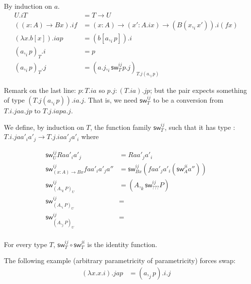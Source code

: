 \documentclass[10pt,a4paper]{article}
\begin{document}
\newcommand\iso[3]{\mathsf{iso}(#1,#2)_{#3}}
\newcommand\sw[3]{\mathsf{sw}^{#1#2}_{#3}}

\begin{definition}[$a.i$]
By induction on $a$.
\begin{align*}
  U.i T &= T → U \\
  ((x:A) → B x).i f &= (x:A) → (x' : A.i x) → (B (x,_i x')).i (f x) \\
  (λx. b[x]).i a p &= (b [a,_i p]).i \\
  (a,_i p)_T.i  &= p \\
  (a,_i p)_T.j  &= (a.j ,_i \sw i j T p.j)_{T.j (a ,_i p)}
\end{align*}
\end{definition}

Remark on the last line: $p : T.i a$ so $p.j : (T.i a).j p$;  but the pair expects something of type $(T.j (a ,_i p)).i a.j$.
That is, we need $\sw i j T$ to be a conversion from $T.i.j a a.j p$ to $T.j.i a p a.j$.

\begin{definition}[$\sw i j T$]
We define, by induction on $T$, the function family $\sw i j T$, such that
it has type : $T.i.j a a'_i a'_j → T.j.i a a'_j a'_i $ where
  
\begin{align*}
  \sw i j {U} R a a'_i a'_j & = R a a'_j a'_i  \\
  \sw i j {(x:A) → B x} f a a'_i a'_j a'' & = \sw i j {B x} (f a a'_j a'_i (\sw j i A a'')) \\
  \sw i j {(A ,_k P)_U} & = (A ,_k \sw i j {???} P) \\
  \sw i j {(A ,_i P)_U} & =  \\
  \sw i j {(A ,_j P)_U} & =  \\
\end{align*}
\end{definition}


\begin{theorem}
For every type $T$, $\sw i j T ∘ \sw j i T$ is the identity function.
\end{theorem}

The following example (arbitrary parametricity of parametricity) forces swap:
\begin{align*}
  (λx. x.i).j a p &= (a ,_j p).i.j
\end{align*}
\end{document}
